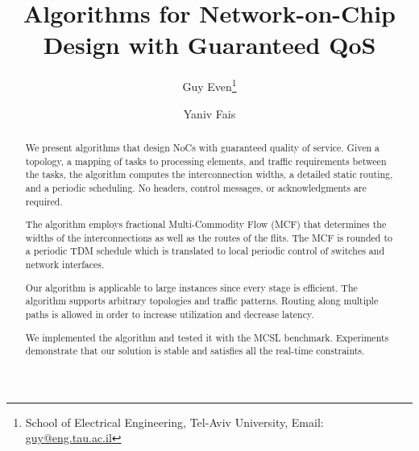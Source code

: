 \documentclass[a4paper,12pt]{article}
\newenvironment{proof sketch}[1]{\noindent {\emph{Proof sketch of #1:}}}{\hfill \qed}
\begin{document}
\begin{titlepage}
  \title{Algorithms for Network-on-Chip Design with Guaranteed QoS} \author{ Guy Even\thanks{ School
      of Electrical Engineering, Tel-Aviv University, Email: \protect\url{guy@eng.tau.ac.il}
}
    \and Yaniv Fais }

 \maketitle
  \begin{abstract}
    We present algorithms that design NoCs with guaranteed quality of service.  Given
    a topology, a mapping of tasks to processing elements, and traffic requirements
    between the tasks, the algorithm computes the interconnection widths, a detailed
    static routing, and a periodic scheduling.  No headers, control messages, or
    acknowledgments are required.


    The algorithm employs fractional Multi-Commodity Flow (MCF) that determines the
    widths of the interconnections as well as the routes of the flits.  The MCF is
    rounded to a periodic TDM schedule which is translated to local periodic control
    of switches and network interfaces.

    Our algorithm is applicable to large instances since every stage is efficient.
    The algorithm supports arbitrary topologies and traffic patterns.  Routing along
    multiple paths is allowed in order to increase utilization and decrease latency.

    We implemented the algorithm and tested it with the MCSL benchmark. Experiments
    demonstrate that our solution is stable and satisfies all the real-time
    constraints.
  \end{abstract}
\end{titlepage}
\end{document}
